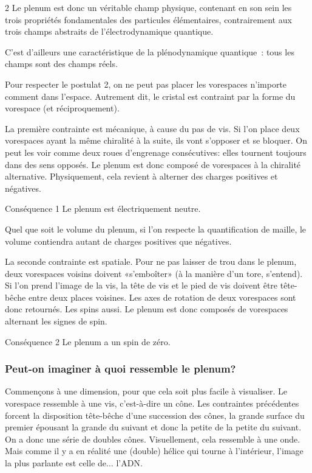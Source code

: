 \begin{multicols}{2}
Le plenum est donc un véritable champ physique, contenant en son sein
les trois propriétés fondamentales des particules élémentaires,
contrairement aux trois champs abstraits de l'électrodynamique
quantique.

C'est d'ailleurs une caractéristique de la plénodynamique quantique :
tous les champs sont des champs réels.

Pour respecter le postulat 2, on ne peut pas placer les vorespaces
n'importe comment dans l'espace. Autrement dit, le cristal est
contraint par la forme du vorespace (et réciproquement).

La première contrainte est mécanique, à cause du pas de vis. Si l'on
place deux vorespaces ayant la même chiralité à la suite, ils vont
s'opposer et se bloquer. On peut les voir comme deux roues d'engrenage
consécutives: elles tournent toujours dans des sens opposés. Le
plenum est donc composé de vorespaces à la chiralité alternative.
Physiquement, cela revient à alterner des charges positives et
négatives.

\begin{mybox}[breakable,colback=blue!10, colbacktitle=pkcolor]{Conséquence 1}
Le plenum est électriquement neutre.
\end{mybox}
\medskip

Quel que soit le volume du plenum, si l'on respecte la quantification
de maille, le volume contiendra autant de charges positives que
négatives.
\bigskip

La seconde contrainte est spatiale. Pour ne pas laisser de trou dans
le plenum, deux vorespaces voisins doivent «s'emboîter» (à la
manière d'un tore, s'entend). Si l'on prend l'image de la vis, la tête
de vis et le pied de vis doivent être tête-bêche entre deux places
voisines. Les axes de rotation de deux vorespaces sont donc retournés.
Les spins aussi. Le plenum est donc composés de vorespaces alternant
les signes de spin.

\begin{mybox}[breakable,colback=blue!10, colbacktitle=pkcolor]{Conséquence 2}
Le plenum a un spin de zéro.
\end{mybox}

\subsubsection*{Peut-on imaginer à quoi ressemble le plenum?}

Commençons à une dimension, pour que cela soit plus facile à
visualiser. Le vorespace ressemble à une vis, c'est-à-dire un cône.
Les contraintes précédentes forcent la disposition tête-bêche d'une
succession des cônes, la grande surface du premier épousant la grande
du suivant et donc la petite de la petite du suivant. On a donc une
série de doubles cônes. Visuellement, cela ressemble à une onde. Mais
comme il y a en réalité une (double) hélice qui tourne à l'intérieur,
l'image la plus parlante est celle de$\ldots$ l'ADN.


\end{multicols}
